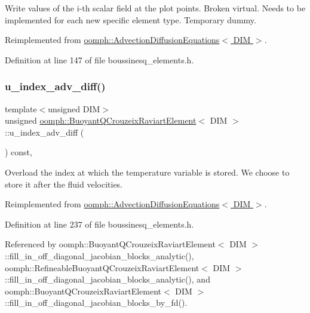 Write values of the i-\/th scalar field at the plot points. Broken virtual. Needs to be implemented for each new specific element type. Temporary dummy. 



Reimplemented from \hyperlink{classoomph_1_1AdvectionDiffusionEquations_a7e4c60334ef457e6155e84a9d24062cf}{oomph\+::\+Advection\+Diffusion\+Equations$<$ D\+I\+M $>$}.



Definition at line 147 of file boussinesq\+\_\+elements.\+h.

\mbox{\label{classoomph_1_1BuoyantQCrouzeixRaviartElement_acf5fa44f694c5374c61a964020437bf4}} 
\subsubsection{\texorpdfstring{u\+\_\+index\+\_\+adv\+\_\+diff()}{u\_index\_adv\_diff()}}
{\footnotesize\ttfamily template$<$unsigned D\+IM$>$ \\
unsigned \hyperlink{classoomph_1_1BuoyantQCrouzeixRaviartElement}{oomph\+::\+Buoyant\+Q\+Crouzeix\+Raviart\+Element}$<$ D\+IM $>$\+::u\+\_\+index\+\_\+adv\+\_\+diff (\begin{DoxyParamCaption}{ }\end{DoxyParamCaption}) const\hspace{0.3cm}{\ttfamily [inline]}, {\ttfamily [virtual]}}



Overload the index at which the temperature variable is stored. We choose to store it after the fluid velocities. 



Reimplemented from \hyperlink{classoomph_1_1AdvectionDiffusionEquations_aadffa26c42be5d4a1156a7467de48fb8}{oomph\+::\+Advection\+Diffusion\+Equations$<$ D\+I\+M $>$}.



Definition at line 237 of file boussinesq\+\_\+elements.\+h.



Referenced by oomph\+::\+Buoyant\+Q\+Crouzeix\+Raviart\+Element$<$ D\+I\+M $>$\+::fill\+\_\+in\+\_\+off\+\_\+diagonal\+\_\+jacobian\+\_\+blocks\+\_\+analytic(), oomph\+::\+Refineable\+Buoyant\+Q\+Crouzeix\+Raviart\+Element$<$ D\+I\+M $>$\+::fill\+\_\+in\+\_\+off\+\_\+diagonal\+\_\+jacobian\+\_\+blocks\+\_\+analytic(), and oomph\+::\+Buoyant\+Q\+Crouzeix\+Raviart\+Element$<$ D\+I\+M $>$\+::fill\+\_\+in\+\_\+off\+\_\+diagonal\+\_\+jacobian\+\_\+blocks\+\_\+by\+\_\+fd().


